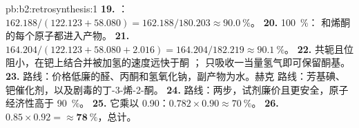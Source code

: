 \begin{solution}{pb:b2:retrosynthesis:1}
\textbf{19.} ：$162.188/(122.123 + 58.080) = 162.188/180.203
\approx 90.0~\%$。
\textbf{20.} 100~\%： 和烯酮的每个原子都进入产物。
\textbf{21.} $164.204/(122.123 + 58.080 + 2.016) = 164.204/182.219 \approx 90.1~\%$。
\textbf{22.}  共轭且位阻小，在钯上结合并被加氢的速度远快于酮 ；
只吸收一当量氢气即可保留酮基。
\textbf{23.} 路线：价格低廉的醛、丙酮和氢氧化钠，副产物为水。赫克
路线：芳基碘、钯催化剂，以及剧毒的丁-3-烯-2-酮。
\textbf{24.} 路线：两步，试剂廉价且更安全，原子经济性高于 90~\%。
\textbf{25.} 它乘以 0.90：$0.782 \times 0.90 \approx 70~\%$。
\textbf{26.} $0.85 \times 0.92 = \boldsymbol{\approx 78~\%}$，总计。
\end{solution}
